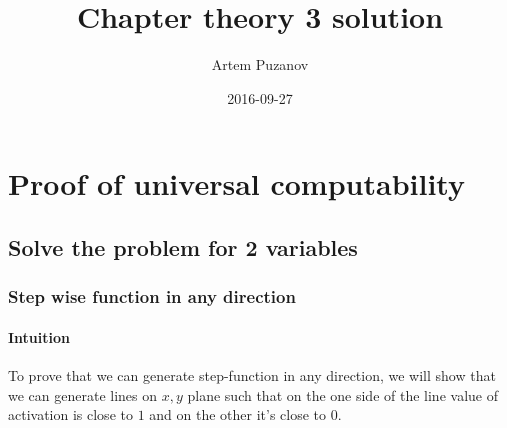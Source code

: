 \documentclass{article}
\title{Chapter theory 3 solution}
\date{2016-09-27}
\author{Artem Puzanov}
\begin{document}
\maketitle
{}
\newpage
{}


\section{Proof of universal computability}
\subsection{Solve the problem for 2 variables}

\subsubsection{Step wise function in any direction}
\paragraph{Intuition}
To prove that we can generate step-function in any direction, we will show that we can
generate lines on ${x, y}$ plane such that on the one side of the line value of activation is close to $1$
and on the other it's close to $0$. 
\end{document}
